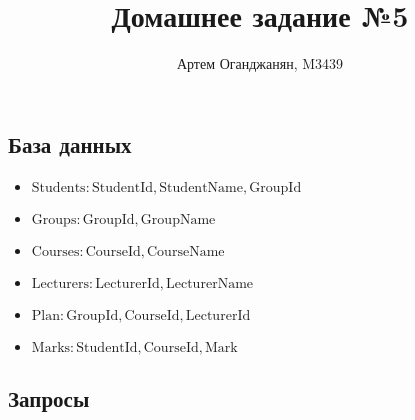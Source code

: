 \documentclass{article}
\title{Домашнее задание №5}
\author{Артем Оганджанян, M3439}
\date{}
\newcommand{\Students}{\mathrm{Students}}
\newcommand{\StudentId}{\mathrm{StudentId}}
\newcommand{\StudentName}{\mathrm{StudentName}}
\newcommand{\Groups}{\mathrm{Groups}}
\newcommand{\GroupId}{\mathrm{GroupId}}
\newcommand{\GroupName}{\mathrm{GroupName}}
\newcommand{\Courses}{\mathrm{Courses}}
\newcommand{\CourseId}{\mathrm{CourseId}}
\newcommand{\CourseName}{\mathrm{CourseName}}
\newcommand{\Plan}{\mathrm{Plan}}
\newcommand{\Lecturers}{\mathrm{Lecturers}}
\newcommand{\LecturerId}{\mathrm{LecturerId}}
\newcommand{\LecturerName}{\mathrm{LecturerName}}
\newcommand{\Marks}{\mathrm{Marks}}
\newcommand{\Mark}{\mathrm{Mark}}
\begin{document}
\renewcommand{\count}{\operatorname{count}}

\maketitle

\subsection{\texorpdfstring{База данных}{DB}}

\begin{itemize}
    \item $\Students: \StudentId, \StudentName, \GroupId$
    \item $\Groups: \GroupId, \GroupName$
    \item $\Courses: \CourseId, \CourseName$
    \item $\Lecturers: \LecturerId, \LecturerName$
    \item $\Plan: \GroupId, \CourseId, \LecturerId$
    \item $\Marks: \StudentId, \CourseId, \Mark$
\end{itemize}

\subsection{\texorpdfstring{Запросы}{Queries}}
\end{document}
